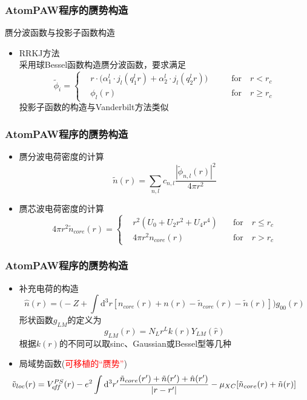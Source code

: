 \frame
{
	\frametitle{\textrm{AtomPAW}程序的赝势构造}
	赝分波函数与投影子函数构造
	\begin{itemize}
		\item \textrm{RRKJ}方法\\
			采用球\textrm{Bessel}函数构造赝分波函数，要求满足
	\begin{displaymath}
		\tilde\phi_i=\left\{
			\begin{aligned}
				&r\cdot\bigg(\alpha_1^l\cdot j_l(q_1^lr)+\alpha_2^l\cdot j_l(q_2^lr)\bigg) \qquad &\mathrm{for}\quad r<r_c \\
				&\phi_l(r)\qquad &\mathrm{for}\quad r\geqslant r_c
			\end{aligned}
			\right.
	\end{displaymath}
	投影子函数的构造与\textrm{Vanderbilt}方法类似
	\end{itemize}
}


\frame
{
	\frametitle{\textrm{AtomPAW}程序的赝势构造}
	\begin{itemize}
		\item 赝分波电荷密度的计算
	$$\tilde n(r)=\sum_{n,l}c_{n,l}\dfrac{|\tilde\phi_{n,l}(r)|^2}{4\pi r^2}$$
		\item 赝芯波电荷密度的计算
	\begin{displaymath}
		4\pi r^2\tilde n_{core}(r)=\left\{
			\begin{aligned}
				&r^2(U_0+U_2r^2+U_4r^4)\quad &\mathrm{for}\quad r\leqslant r_c \\
				&4\pi r^2n_{core}(r)\quad &\mathrm{for}\quad r>r_c
			\end{aligned}
			\right.
	\end{displaymath}
	\end{itemize}
}

\frame
{
	\frametitle{\textrm{AtomPAW}程序的赝势构造}
	\begin{itemize}
		\item 补充电荷的构造
			$$\hat n(r)=\bigg(-Z+\int\mathrm{d}^3r[n_{core}(r)+n(r)-\tilde n_{core}(r)-\tilde n(r)]\bigg)g_{00}(r)$$
			形状函数$g_{LM}$的定义为$$g_{LM}(r)=N_Lr^Lk(r)Y_{LM}(\hat r)$$
			根据$k(r)$的不同可以取\textrm{sinc}、\textrm{Gaussian}或\textrm{Bessel}型等几种
		\item 局域势函数(\textcolor{red}{可移植的“赝势”})
			{\fontsize{9.5pt}{5.2pt}\selectfont$$\hspace*{-25pt}\tilde v_{loc}(r)=V_{e\!f\!f}^{PS}(r)-e^2\int\mathrm{d}^3r^{\prime}\dfrac{\tilde n_{core}(r^{\prime})+\tilde n(r^{\prime})+\hat n(r^{\prime})}{|r-r^{\prime}|}-\mu_{XC}[\tilde n_{core}(r)+\tilde n(r)]$$}
	\end{itemize}
}

